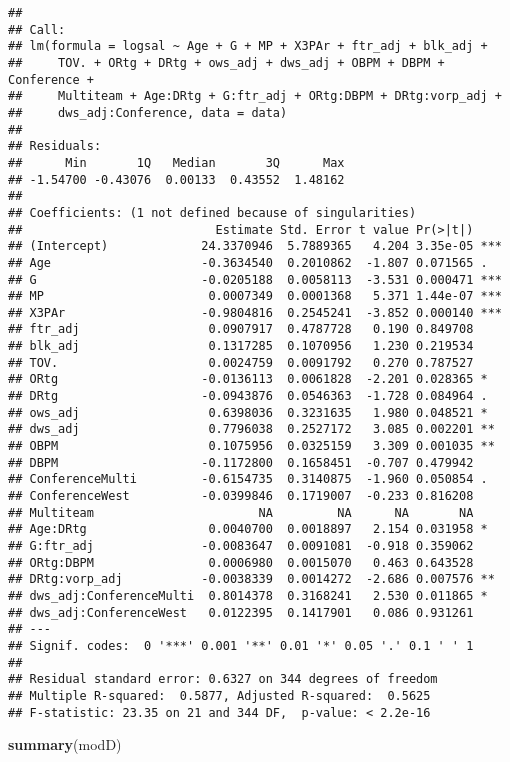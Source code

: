 \documentclass[]{article}
\newenvironment{Shaded}{\begin{snugshade}}{\end{snugshade}}
\newcommand{\KeywordTok}[1]{\textcolor[rgb]{0.13,0.29,0.53}{\textbf{#1}}}
\newcommand{\NormalTok}[1]{#1}
\begin{document}
\begin{verbatim}
## 
## Call:
## lm(formula = logsal ~ Age + G + MP + X3PAr + ftr_adj + blk_adj + 
##     TOV. + ORtg + DRtg + ows_adj + dws_adj + OBPM + DBPM + Conference + 
##     Multiteam + Age:DRtg + G:ftr_adj + ORtg:DBPM + DRtg:vorp_adj + 
##     dws_adj:Conference, data = data)
## 
## Residuals:
##      Min       1Q   Median       3Q      Max 
## -1.54700 -0.43076  0.00133  0.43552  1.48162 
## 
## Coefficients: (1 not defined because of singularities)
##                           Estimate Std. Error t value Pr(>|t|)    
## (Intercept)             24.3370946  5.7889365   4.204 3.35e-05 ***
## Age                     -0.3634540  0.2010862  -1.807 0.071565 .  
## G                       -0.0205188  0.0058113  -3.531 0.000471 ***
## MP                       0.0007349  0.0001368   5.371 1.44e-07 ***
## X3PAr                   -0.9804816  0.2545241  -3.852 0.000140 ***
## ftr_adj                  0.0907917  0.4787728   0.190 0.849708    
## blk_adj                  0.1317285  0.1070956   1.230 0.219534    
## TOV.                     0.0024759  0.0091792   0.270 0.787527    
## ORtg                    -0.0136113  0.0061828  -2.201 0.028365 *  
## DRtg                    -0.0943876  0.0546363  -1.728 0.084964 .  
## ows_adj                  0.6398036  0.3231635   1.980 0.048521 *  
## dws_adj                  0.7796038  0.2527172   3.085 0.002201 ** 
## OBPM                     0.1075956  0.0325159   3.309 0.001035 ** 
## DBPM                    -0.1172800  0.1658451  -0.707 0.479942    
## ConferenceMulti         -0.6154735  0.3140875  -1.960 0.050854 .  
## ConferenceWest          -0.0399846  0.1719007  -0.233 0.816208    
## Multiteam                       NA         NA      NA       NA    
## Age:DRtg                 0.0040700  0.0018897   2.154 0.031958 *  
## G:ftr_adj               -0.0083647  0.0091081  -0.918 0.359062    
## ORtg:DBPM                0.0006980  0.0015070   0.463 0.643528    
## DRtg:vorp_adj           -0.0038339  0.0014272  -2.686 0.007576 ** 
## dws_adj:ConferenceMulti  0.8014378  0.3168241   2.530 0.011865 *  
## dws_adj:ConferenceWest   0.0122395  0.1417901   0.086 0.931261    
## ---
## Signif. codes:  0 '***' 0.001 '**' 0.01 '*' 0.05 '.' 0.1 ' ' 1
## 
## Residual standard error: 0.6327 on 344 degrees of freedom
## Multiple R-squared:  0.5877, Adjusted R-squared:  0.5625 
## F-statistic: 23.35 on 21 and 344 DF,  p-value: < 2.2e-16
\end{verbatim}

\begin{Shaded}
\begin{Highlighting}[]
\KeywordTok{summary}\NormalTok{(modD)}
\end{Highlighting}
\end{Shaded}
\end{document}
